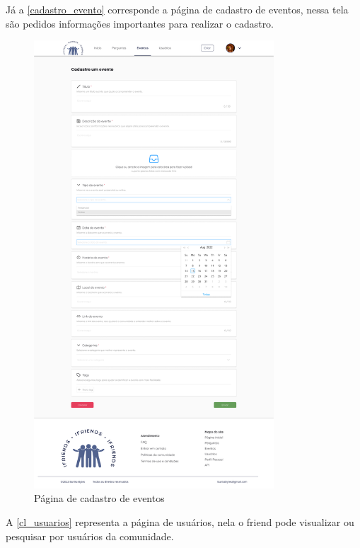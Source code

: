 Já a \autoref{cadastro_evento} corresponde a página de cadastro de eventos, nessa tela são pedidos informações importantes para realizar o cadastro. 

\begin{figure}[htb]
\centering
\caption{\label{cadastro_evento} Página de cadastro de eventos}
\includegraphics[width=0.8\textwidth]{anexos/Imagens_Prototipo/com_login/cadastro_eventos.png}
\end{figure}
\FloatBarrier

A \autoref{cl_usuarios} representa a página de usuários, nela o \gls{friend} pode visualizar ou pesquisar por usuários da comunidade. 

